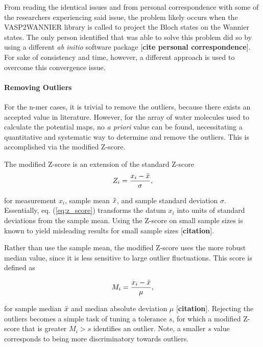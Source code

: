         From reading the identical issues and from personal correspondence with some of the researchers experiencing said issue, the problem likely occurs when the VASP2WANNIER library is called to project the Bloch states on the Wannier states. The only person identified that was able to solve this problem did so by using a different \textit{ab initio} software package [\textbf{cite personal correspondence}]. For sake of consistency and time, however, a different approach is used to overcome this convergence issue.
        
        \paragraph{Removing Outliers} For the n-mer cases, it is trivial to remove the outliers, because there exists an accepted value in literature. However, for the array of water molecules used to calculate the potential maps, no \textit{a priori} value can be found, necessitating a quantitative and systematic way to determine and remove the outliers. This is accomplished via the modified Z-score.
        
        The modified Z-score is an extension of the standard Z-score 
        \begin{equation}
        \label{eq:z_score}
            Z_i = \frac{x_i - \Tilde{x}}{\sigma},
        \end{equation}
        
        \noindent for measurement $x_i$, sample mean $\Tilde{x}$, and sample standard deviation $\sigma$. Essentially, eq. (\ref{eq:z_score}) transforms the datum $x_i$ into units of standard deviations from the sample mean. Using the Z-score on small sample sizes is known to yield misleading results for small sample sizes [\textbf{citation}].
        
        Rather than use the sample mean, the modified Z-score uses the more robust median value, since it is less sensitive to large outlier fluctuations. This score is defined as
        
        \begin{equation}
            M_i = \frac{x_i - \Bar{x}}{\mu},
        \end{equation}
        
        \noindent for sample median $\Bar{x}$ and median absolute deviation $\mu$ [\textbf{citation}]. Rejecting the outliers becomes a simple task of tuning a tolerance $s$, for which a modified Z-score that is greater $M_i>s$ identifies an outlier. Note, a smaller $s$ value corresponds to being more discriminatory towards outliers.
        
